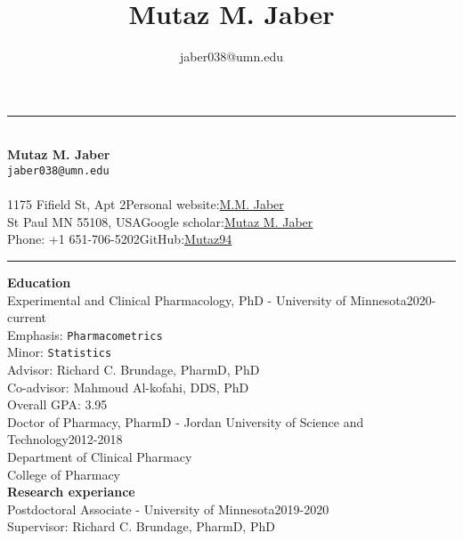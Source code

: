 \documentclass[a4paper,11pt]{article}
\title{\LARGE\bfseries Mutaz M. \textbf{Jaber}}
\author{jaber038@umn.edu}
\date{}
\begin{document}
\rule{\textwidth}{1pt}
~\\[0.5cm]
{\centering\textbf{\LARGE Mutaz M. Jaber}\\[0.1cm] \texttt{jaber038@umn.edu} \\[-0.2cm]}
~\\[0.1cm]
1175 Fifield St, Apt 2\hfill Personal website:\href{https://mutaz94.github.io/}{M.M. Jaber}\\
St Paul MN 55108, USA\hfill Google scholar:\href{https://scholar.google.com/citations?user=uugc-IgAAAAJ&hl=en&authuser=1}{Mutaz M. Jaber}\\
Phone: +1 651-706-5202\hfill GitHub:\href{https://github.com/Mutaz94}{Mutaz94}\\
\rule{\textwidth}{1pt}

\textbf{Education}\\[-0.3cm]

Experimental and Clinical Pharmacology, PhD - University of Minnesota\hfill 2020-current\\
Emphasis: \texttt{Pharmacometrics}\\
Minor: \texttt{Statistics}\\
Advisor: Richard C. Brundage, PharmD, PhD\\
Co-advisor: Mahmoud Al-kofahi, DDS, PhD\\
Overall GPA: 3.95\\[0.5cm]

Doctor of Pharmacy, PharmD - Jordan University of Science and Technology\hfill 2012-2018\\
Department of Clinical Pharmacy\\
College of Pharmacy\\[1cm]

\textbf{Research experiance}\\[-0.3cm]

Postdoctoral Associate - University of Minnesota\hfill 2019-2020\\
Supervisor: Richard C. Brundage, PharmD, PhD
\end{document}

